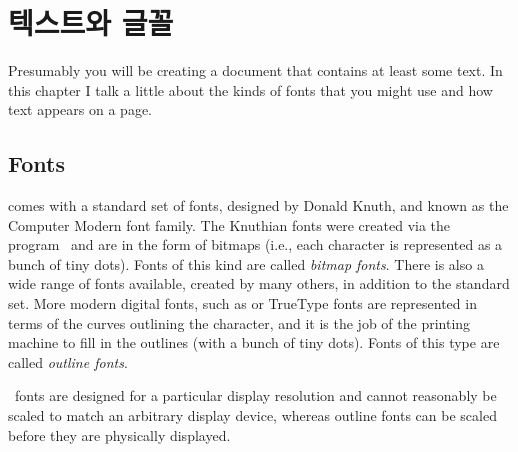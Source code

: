 \chapter{텍스트와 글꼴}

    Presumably you will be creating a document that contains at least some
text. In this chapter I talk a little about the kinds of fonts that you might
use and how text appears on a page.




\section{Fonts} \label{sec:fonts}

    \alltx{} comes with a standard set of fonts, designed by Donald Knuth,
and known as the Computer Modern font family. 
The Knuthian
fonts were created via the \metafont{} 
program~\cite{METAFONT,CM}
and are in the form of bitmaps
(i.e., each character is represented as a bunch of tiny dots). Fonts of
this kind are called \emph{bitmap fonts}.
 There is also a wide range of \metafont{} fonts available, created by 
many others, in addition to the standard set.  More modern
digital fonts, such as \pscript{} or 
TrueType fonts are represented in terms
of the curves outlining the character, and it is the job of the printing
machine to fill in the outlines (with a bunch of tiny dots). Fonts of
this type are called \emph{outline fonts}.

\metafont\ fonts
are designed for a particular display resolution and cannot reasonably 
be scaled to match an arbitrary display device, whereas outline fonts can be 
scaled before they are physically displayed.

